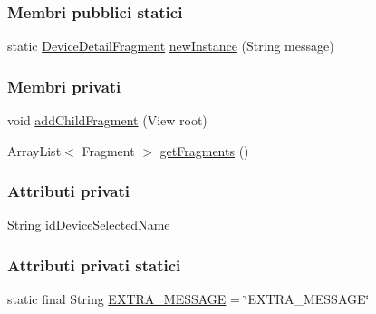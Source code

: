 \subsubsection*{Membri pubblici statici}
\begin{DoxyCompactItemize}
\item 
static \hyperlink{classit_1_1unibo_1_1torsello_1_1bluetoothpositioning_1_1fragment_1_1DeviceDetailFragment}{Device\+Detail\+Fragment} \hyperlink{classit_1_1unibo_1_1torsello_1_1bluetoothpositioning_1_1fragment_1_1DeviceDetailFragment_a626de18d36d44ae0b4ff21c2527bdf5a_a626de18d36d44ae0b4ff21c2527bdf5a}{new\+Instance} (String message)
\end{DoxyCompactItemize}
\subsubsection*{Membri privati}
\begin{DoxyCompactItemize}
\item 
void \hyperlink{classit_1_1unibo_1_1torsello_1_1bluetoothpositioning_1_1fragment_1_1DeviceDetailFragment_a62c541b8382a522f06a5d9c56cf50b26_a62c541b8382a522f06a5d9c56cf50b26}{add\+Child\+Fragment} (View root)
\item 
Array\+List$<$ Fragment $>$ \hyperlink{classit_1_1unibo_1_1torsello_1_1bluetoothpositioning_1_1fragment_1_1DeviceDetailFragment_a98e370cfcbfe5eaa4e1fe9242b00e639_a98e370cfcbfe5eaa4e1fe9242b00e639}{get\+Fragments} ()
\end{DoxyCompactItemize}
\subsubsection*{Attributi privati}
\begin{DoxyCompactItemize}
\item 
String \hyperlink{classit_1_1unibo_1_1torsello_1_1bluetoothpositioning_1_1fragment_1_1DeviceDetailFragment_a6d52d8371a07fb8da75879758d1d6942_a6d52d8371a07fb8da75879758d1d6942}{id\+Device\+Selected\+Name}
\end{DoxyCompactItemize}
\subsubsection*{Attributi privati statici}
\begin{DoxyCompactItemize}
\item 
static final String \hyperlink{classit_1_1unibo_1_1torsello_1_1bluetoothpositioning_1_1fragment_1_1DeviceDetailFragment_a9f7fff4a2b22105976f2c7223d88f9ae_a9f7fff4a2b22105976f2c7223d88f9ae}{E\+X\+T\+R\+A\+\_\+\+M\+E\+S\+S\+A\+GE} = \char`\"{}E\+X\+T\+R\+A\+\_\+\+M\+E\+S\+S\+A\+GE\char`\"{}
\end{DoxyCompactItemize}


